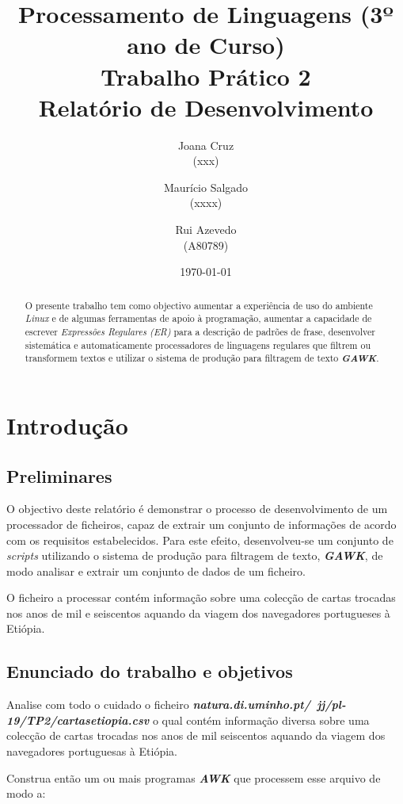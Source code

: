 \documentclass[11pt,a4paper]{report}
\title{Processamento de Linguagens (3º ano de Curso)\\
       \textbf{Trabalho Prático 2}\\ Relatório de Desenvolvimento
       } %
\author{Joana Cruz\\ (xxx) \and Maurício Salgado\\ (xxxx)
         \and Rui Azevedo\\ (A80789)
       } %
\date{\today}
\begin{document}
\maketitle

\newpage

\begin{abstract}
    \qquad O presente trabalho tem como objectivo aumentar a experiência de uso do ambiente \textit{Linux} e de algumas ferramentas de apoio à programação, aumentar a capacidade de escrever \textit{Expressões Regulares (ER)} para a descrição de padrões de frase, desenvolver sistemática e automaticamente processadores de linguagens regulares que filtrem  ou transformem textos e utilizar o sistema de produção para filtragem de texto \textbf{\textit{GAWK}}.
\end{abstract}

\tableofcontents

\chapter{Introdução}

\section{Preliminares}
    \qquad O objectivo deste relatório é demonstrar o processo de desenvolvimento de um processador de ficheiros, capaz de extrair um conjunto de informações de acordo com os requisitos estabelecidos. Para este efeito, desenvolveu-se um conjunto de \textit{scripts} utilizando o sistema de produção para filtragem de texto, \textbf{\textit{GAWK}}, de modo analisar e extrair um conjunto de dados de um ficheiro.
    
    \quad O ficheiro a processar contém informação sobre uma colecção de cartas trocadas nos anos de mil e seiscentos aquando da viagem dos navegadores portugueses à Etiópia.
    
\section{Enunciado do trabalho e objetivos}
    \qquad Analise com todo o cuidado o ficheiro \textbf{\textit{natura.di.uminho.pt/~jj/pl-19/TP2/cartasetiopia.csv}} o qual contém informação diversa sobre uma colecção de cartas trocadas nos anos de mil seiscentos aquando da viagem dos navegadores portuguesas à Etiópia.

    \qquad Construa então um ou mais programas \textit{\textbf{AWK}} que processem esse arquivo de modo a:
    
\end{document}
